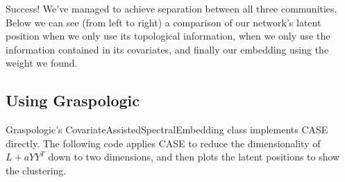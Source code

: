 \documentclass[letterpaper,10pt,english]{jupyterBook}
\begin{document}
\begin{sphinxVerbatim}[commandchars=\\\{\}]
   

    
    

    

    
   
\end{sphinxVerbatim}

\noindent{}

\sphinxAtStartPar
Success! We’ve managed to achieve separation between all three communities. Below we can see (from left to right) a comparison of our network’s latent position when we only use its topological information, when we only use the information contained in its covariates, and finally our embedding using the weight we found.

\noindent{}


\subsection{Using Graspologic}
\label{\detokenize{representations/ch6/joint-representation-learning:using-graspologic}}
\sphinxAtStartPar
Graspologic’s CovariateAssistedSpectralEmbedding class implements CASE directly. The following code applies CASE to reduce the dimensionality of \(L + aYY^T\) down to two dimensions, and then plots the latent positions to show the clustering.
\end{document}
